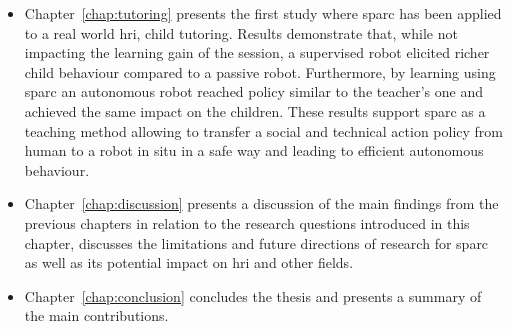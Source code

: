 \begin{itemize}
	\item Chapter~\ref{chap:tutoring} presents the first study where \gls{sparc} has been applied to a real world \gls{hri}, child tutoring. Results demonstrate that, while not impacting the learning gain of the session, a supervised robot elicited richer child behaviour compared to a passive robot. Furthermore, by learning using \gls{sparc} an autonomous robot reached policy similar to the teacher's one and achieved the same impact on the children. These results support \gls{sparc} as a teaching method allowing to transfer a social and technical action policy from human to a robot in situ in a safe way and leading to efficient autonomous behaviour.
	
	\item Chapter~\ref{chap:discussion} presents a discussion of the main findings from the previous chapters in relation to the research questions introduced in this chapter, discusses the limitations and future directions of research for \gls{sparc} as well as its potential impact on \gls{hri} and other fields.

	\item Chapter~\ref{chap:conclusion} concludes the thesis and presents a summary of the main contributions.
	
\end{itemize}
